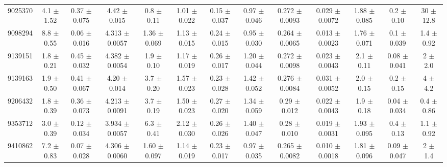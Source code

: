 \begin{table}[H]
\begin{tabular}{c|cccccc|cccccc}
9025370  &        4.1    $\pm$  1.52   &      0.37   $\pm$  0.075  &      4.42   $\pm$  0.015  &      0.8    $\pm$  0.11   &      1.01   $\pm$  0.022  &      0.15   $\pm$  0.037    &        0.97   $\pm$  0.046    &        0.272  $\pm$  0.0093   &        0.029  $\pm$  0.0072   &        1.88   $\pm$  0.085    &        0.2    $\pm$  0.10     &       30      $\pm$  12.8     \\
9098294  &        8.8    $\pm$  0.55   &      0.06   $\pm$  0.016  &      4.313  $\pm$  0.0057 &      1.36   $\pm$  0.069  &      1.13   $\pm$  0.015  &      0.24   $\pm$  0.015    &        0.95   $\pm$  0.030    &        0.264  $\pm$  0.0065   &        0.013  $\pm$  0.0023   &        1.76   $\pm$  0.071    &        0.1    $\pm$  0.039    &        1.4    $\pm$  0.92     \\
9139151  &        1.8    $\pm$  0.21   &      0.45   $\pm$  0.032  &      4.382  $\pm$  0.0054 &      1.9    $\pm$  0.10   &      1.17   $\pm$  0.019  &      0.26   $\pm$  0.017    &        1.20   $\pm$  0.044    &        0.272  $\pm$  0.0098   &        0.023  $\pm$  0.0043   &        2.1    $\pm$  0.11     &        0.08   $\pm$  0.041    &        2      $\pm$  2.0      \\
9139163  &        1.9    $\pm$  0.50   &      0.41   $\pm$  0.067  &      4.20   $\pm$  0.014  &      3.7    $\pm$  0.20   &      1.57   $\pm$  0.023  &      0.23   $\pm$  0.028    &        1.42   $\pm$  0.052    &        0.276  $\pm$  0.0084   &        0.031  $\pm$  0.0052   &        2.0    $\pm$  0.15     &        0.2    $\pm$  0.15     &        4      $\pm$  4.2      \\
9206432  &        1.8    $\pm$  0.39   &      0.36   $\pm$  0.073  &      4.213  $\pm$  0.0091 &      3.7    $\pm$  0.19   &      1.50   $\pm$  0.023  &      0.27   $\pm$  0.020    &        1.34   $\pm$  0.059    &        0.29   $\pm$  0.012    &        0.022  $\pm$  0.0043   &        1.9    $\pm$  0.18     &        0.04   $\pm$  0.034    &        0.4    $\pm$  0.86     \\
9353712  &        3.0    $\pm$  0.39   &      0.12   $\pm$  0.034  &      3.934  $\pm$  0.0057 &      6.3    $\pm$  0.41   &      2.12   $\pm$  0.030  &      0.26   $\pm$  0.026    &        1.40   $\pm$  0.047    &        0.28   $\pm$  0.010    &        0.019  $\pm$  0.0031   &        1.93   $\pm$  0.095    &        0.4    $\pm$  0.13     &        1.1    $\pm$  0.92     \\
9410862  &        7.2    $\pm$  0.83   &      0.07   $\pm$  0.028  &      4.306  $\pm$  0.0060 &      1.60   $\pm$  0.097  &      1.14   $\pm$  0.019  &      0.23   $\pm$  0.017    &        0.97   $\pm$  0.035    &        0.265  $\pm$  0.0082   &        0.010  $\pm$  0.0018   &        1.81   $\pm$  0.096    &        0.09   $\pm$  0.047    &        2      $\pm$  1.4      \\

\end{tabular}
\end{table}

